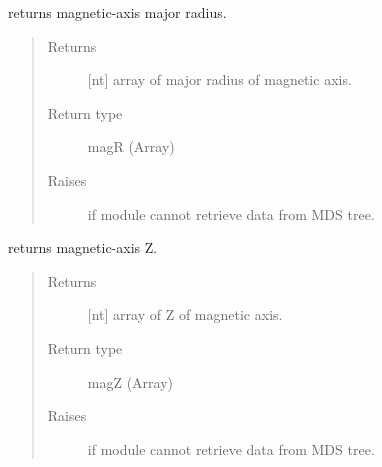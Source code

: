 \documentclass[letterpaper,10pt,english]{sphinxmanual}
\begin{document}
\begin{fulllineitems}
\begin{fulllineitems}
\begin{quote}
\begin{description}
\end{description}\end{quote}

\end{fulllineitems}


\begin{fulllineitems}
\label{\detokenize{eqtools:eqtools.EFIT.EFITTree.getMagR}}
returns magnetic-axis major radius.
\begin{quote}\begin{description}
\item[{Returns}] \leavevmode
{[}nt{]} array of major radius of magnetic axis.

\item[{Return type}] \leavevmode
magR (Array)

\item[{Raises}] \leavevmode
{} \textendash{} if module cannot retrieve data from MDS tree.

\end{description}\end{quote}

\end{fulllineitems}


\begin{fulllineitems}
\label{\detokenize{eqtools:eqtools.EFIT.EFITTree.getMagZ}}
returns magnetic-axis Z.
\begin{quote}\begin{description}
\item[{Returns}] \leavevmode
{[}nt{]} array of Z of magnetic axis.

\item[{Return type}] \leavevmode
magZ (Array)

\item[{Raises}] \leavevmode
{} \textendash{} if module cannot retrieve data from MDS tree.

\end{description}\end{quote}


\end{fulllineitems}
\end{fulllineitems}
\end{document}
